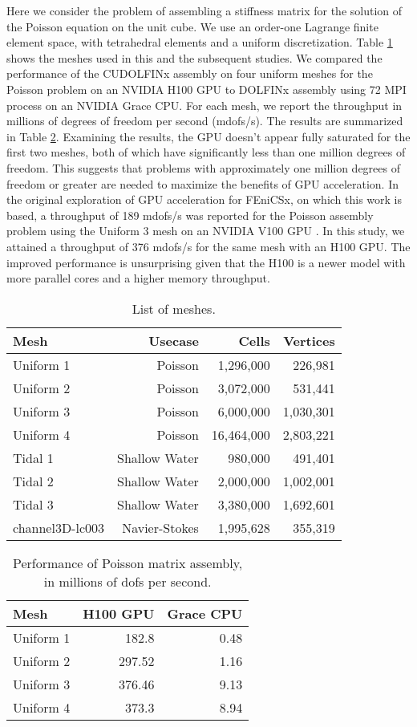 Here we consider the problem of assembling a stiffness matrix for the solution of the Poisson equation on the unit cube. We use an order-one Lagrange finite element space, with tetrahedral elements and a uniform discretization. Table \ref{tab:meshes} shows the meshes used in this and the subsequent studies. We compared the performance of the CUDOLFINx assembly on four uniform meshes for the Poisson problem on an NVIDIA H100 GPU to DOLFINx assembly using 72 MPI process on an NVIDIA Grace CPU. For each mesh, we report the throughput in millions of degrees of freedom per second (mdofs/s). The results are summarized in Table \ref{tab:poisson_results}. Examining the results, the GPU doesn't appear fully saturated for the first two meshes, both of which have significantly less than one million degrees of freedom. This suggests that problems with approximately one million degrees of freedom or greater are needed to maximize the benefits of GPU acceleration. In the original exploration of GPU acceleration for FEniCSx, on which this work is based, a throughput of 189 mdofs/s was reported for the Poisson assembly problem using the Uniform 3 mesh on an NVIDIA V100 GPU \cite{trotter2023targeting}. In this study, we attained a throughput of 376 mdofs/s for the same mesh with an H100 GPU. The improved performance is unsurprising given that the H100 is a newer model with more parallel cores and a higher memory throughput. 
\begin{table}[t]
    \centering
\begin{tabular}{lrrr}
\toprule
Mesh & Usecase & Cells & Vertices\\
\midrule
Uniform 1 & Poisson & 1,296,000 & 226,981 \\ 
Uniform 2 & Poisson & 3,072,000 & 531,441 \\ 
Uniform 3 & Poisson & 6,000,000 & 1,030,301 \\ 
Uniform 4 & Poisson & 16,464,000 & 2,803,221 \\ 
Tidal 1 & Shallow Water & 980,000 & 491,401 \\
Tidal 2 & Shallow Water & 2,000,000 & 1,002,001 \\
Tidal 3 & Shallow Water & 3,380,000 & 1,692,601 \\
channel3D-lc003 & Navier-Stokes & 1,995,628 & 355,319 \\
\bottomrule
\end{tabular}
\caption{List of meshes.}
    \label{tab:meshes}
\end{table}

\begin{table}[t]
    \centering
\begin{tabular}{lrr}
\toprule
Mesh & H100 GPU & Grace CPU \\
\midrule
Uniform 1 & 182.8 & 0.48 \\ 
Uniform 2 & 297.52 & 1.16 \\ 
Uniform 3 & 376.46 & 9.13 \\ 
Uniform 4 & 373.3 & 8.94 \\ 
\bottomrule
\end{tabular}
\caption{Performance of Poisson matrix assembly, in millions of dofs per second.}
    \label{tab:poisson_results}
\end{table}


